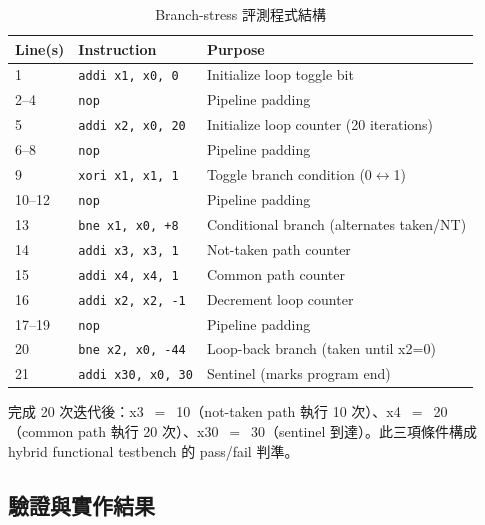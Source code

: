 \documentclass[12pt,a4paper]{article}
\begin{document}
	\begin{table}[htbp]
		\centering
		\caption{Branch-stress 評測程式結構}
		\label{tab:branchstress}
		\begin{tabular}{lll}
			\toprule
			\textbf{Line(s)} & \textbf{Instruction}      & \textbf{Purpose}                              \\
			\midrule
			1                & \texttt{addi x1, x0, 0}   & Initialize loop toggle bit                    \\
			2--4             & \texttt{nop}              & Pipeline padding                              \\
			5                & \texttt{addi x2, x0, 20}  & Initialize loop counter (20 iterations)       \\
			6--8             & \texttt{nop}              & Pipeline padding                              \\
			9                & \texttt{xori x1, x1, 1}   & Toggle branch condition (0$\leftrightarrow$1) \\
			10--12           & \texttt{nop}              & Pipeline padding                              \\
			13               & \texttt{bne x1, x0, +8}   & Conditional branch (alternates taken/NT)      \\
			14               & \texttt{addi x3, x3, 1}   & Not-taken path counter                        \\
			15               & \texttt{addi x4, x4, 1}   & Common path counter                           \\
			16               & \texttt{addi x2, x2, -1}  & Decrement loop counter                        \\
			17--19           & \texttt{nop}              & Pipeline padding                              \\
			20               & \texttt{bne x2, x0, -44}  & Loop-back branch (taken until x2=0)           \\
			21               & \texttt{addi x30, x0, 30} & Sentinel (marks program end)                  \\
			\bottomrule
		\end{tabular}
	\end{table}

	完成 20 次迭代後：x3~$=$~10（not-taken path 執行 10 次）、x4~$=$~20（common path 執行 20 次）、x30~$=$~30（sentinel 到達）。此三項條件構成 hybrid functional testbench 的 pass/fail 判準。

	\subsection{驗證與實作結果}
	\label{sec:results}
\end{document}
